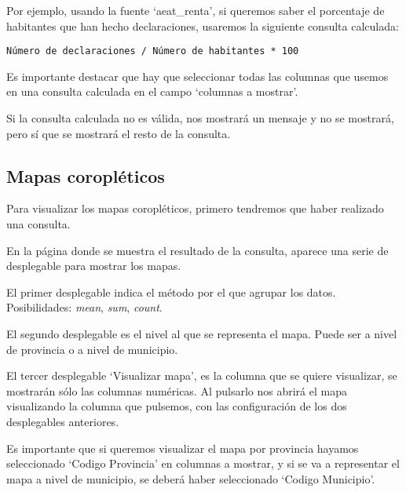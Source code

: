 Por ejemplo, usando la fuente `aeat\_renta', si queremos saber el porcentaje de habitantes que han hecho declaraciones, usaremos la siguiente consulta calculada:

\begin{lstlisting}
Número de declaraciones / Número de habitantes * 100
\end{lstlisting}


Es importante destacar que hay que seleccionar todas las columnas que usemos en una consulta calculada en el campo `columnas a mostrar'.

Si la consulta calculada no es válida, nos mostrará un mensaje y no se mostrará, pero sí que se mostrará el resto de la consulta.


\subsection{Mapas coropléticos}

Para visualizar los mapas coropléticos, primero tendremos que haber realizado una consulta.

En la página donde se muestra el resultado de la consulta, aparece una serie de desplegable para mostrar los mapas. 


El primer desplegable indica el método por el que agrupar los datos. Posibilidades: \textit{mean}, \textit{sum}, \textit{count}.

El segundo desplegable es el nivel al que se representa el mapa. Puede ser a nivel de provincia o a nivel de municipio.

El tercer desplegable `Visualizar mapa', es la columna que se quiere visualizar, se mostrarán sólo las columnas numéricas. Al pulsarlo nos abrirá el mapa visualizando la columna que pulsemos, con las configuración de los dos desplegables anteriores.


Es importante que si queremos visualizar el mapa por provincia hayamos seleccionado `Codigo Provincia' en columnas a mostrar, y si se va a representar el mapa a nivel de municipio, se deberá haber seleccionado `Codigo Municipio'. 


